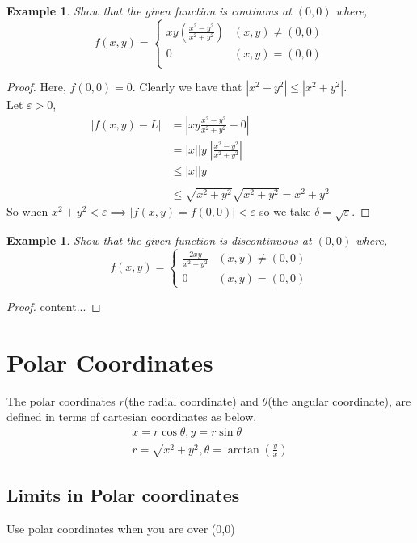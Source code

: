 \documentclass[oneside,11pt,pdftex]{book}%
\numberwithin{equation}{section}
\newtheorem{example}[theorem]{Example}
\numberwithin{section}{chapter}
\numberwithin{equation}{chapter}
\begin{document}
\begin{example}
	Show that the given function is continous at $ (0,0) $ where,
	\[
	f(x,y)=
	\begin{cases}
		xy\left(\frac{x^2-y^2}{x^2+y^2}\right)& (x,y)\neq (0,0)\\
		0 & (x,y) = (0,0)\\
	\end{cases}
	\]
\end{example}
\begin{proof}
	Here, $ f(0,0) =0$. Clearly we have that $ |x^2-y^2|\leq |x^2+y^2| $.\\
	Let $ \varepsilon >0 $, 
	\begin{align*}
		|f(x,y)-L|&=\left|xy\frac{x^2-y^2}{x^2+y^2}-0\right|\\
		&=|x| |y|\left|\frac{x^2-y^2}{x^2+y^2}\right|\\
		&\leq |x||y|\\\\
		&\leq \sqrt{x^2+y^2}\sqrt{x^2+y^2}=x^2+y^2
	\end{align*}
So when $ x^2+y^2<\varepsilon \implies |f(x,y) =f(0,0)|<\varepsilon$ 
so we take $ \delta = \sqrt{\varepsilon} $.
\end{proof}


\begin{example}
	Show that the given function is discontinuous at $ (0,0) $ where,
	\[ f(x,y)=\begin{cases}
		\frac{2xy}{x^2+y^2} & (x,y)\neq(0,0)\\
		0 & (x,y)=(0,0)
	\end{cases} \]
\end{example}
\begin{proof}
	content...
\end{proof}

\section{Polar Coordinates}
The polar coordinates $ r $(the radial coordinate) and $ \theta  $(the angular coordinate), are defined in terms of cartesian coordinates as below.
\begin{align*}
	x= r \cos \theta, y = r \sin \theta\\
	r= \sqrt{x^2+y^2}, \theta = \arctan \left( \frac{y}{x}\right)
\end{align*}

\subsection{Limits in Polar coordinates}
Use polar coordinates when you are over (0,0)
\end{document}
